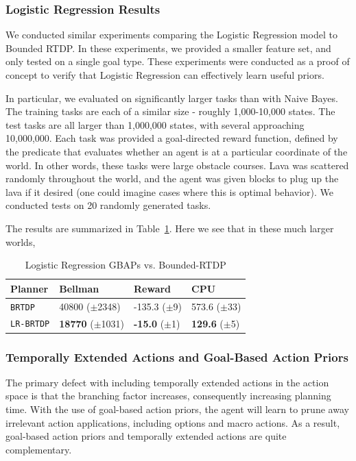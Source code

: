 \documentclass[11pt]{article}
\begin{document}
\subsubsection{Logistic Regression Results}
We conducted similar experiments comparing the Logistic Regression model to Bounded RTDP. In these experiments, we provided a smaller feature set, and only tested on a single goal type. These experiments were conducted as a proof of concept to verify that Logistic Regression can effectively learn useful priors.

In particular, we evaluated on significantly larger tasks than with Naive Bayes. The training tasks are each of a similar size - roughly 1,000-10,000 states. The test tasks are all larger than 1,000,000 states, with several approaching 10,000,000. Each task was provided a goal-directed reward function, defined by the predicate that evaluates whether an agent is at a particular coordinate of the world. In other words, these tasks were large obstacle courses. Lava was scattered randomly throughout the world, and the agent was given blocks to plug up the lava if it desired (one could imagine cases where this is optimal behavior). We conducted tests on 20 randomly generated tasks.

The results are summarized in Table~\ref{table:log_reg_results}. Here we see that in these much larger worlds, 

\begin{table}
\centering
{}
\small
\begin{tabular}{@{}llll@{}}\toprule
Planner & Bellman & Reward & CPU \\ \midrule
\texttt{BRTDP}   			&	40800 ($\pm$2348)		&	-135.3 ($\pm$9)		& 573.6 ($\pm$33) \\
\texttt{LR-BRTDP} 			& 	{\bf 18770} ($\pm$1031)	&	{\bf -15.0} ($\pm$1)& {\bf 129.6} ($\pm$5) \\ \hline
\end{tabular}
\caption{Logistic Regression GBAPs vs. Bounded-RTDP}
\label{table:log_reg_results}
\end{table}


\subsubsection{Temporally Extended Actions and Goal-Based Action Priors}

The primary defect with including temporally extended actions in the action space is that the branching factor increases, consequently increasing planning time. With the use of goal-based action priors, the agent will learn to prune away irrelevant action applications, including options and macro actions. As a result, goal-based action priors and temporally extended actions are quite complementary.
\end{document}
